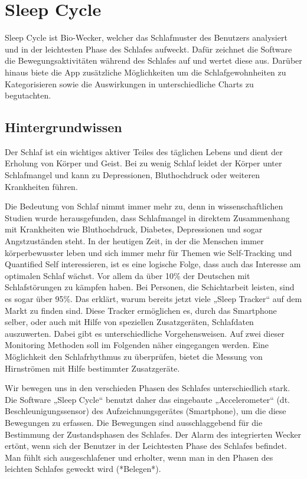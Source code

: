 \section{Sleep Cycle}
\label{ch:Apps:sec:SleepCycle}

Sleep Cycle ist Bio-Wecker, welcher das Schlafmuster des Benutzers analysiert und in der leichtesten Phase des Schlafes aufweckt.
Dafür zeichnet die Software die Bewegungsaktivitäten während des Schlafes auf und wertet diese aus.
Darüber hinaus biete die App zusätzliche Möglichkeiten um die Schlafgewohnheiten zu Kategorisieren sowie die Auswirkungen in unterschiedliche Charts zu begutachten. \cite{Chen:SleepMonitoring}

\subsection{Hintergrundwissen}
\label{ch:Apps:sec:Sleepcycle:subsec:H}

Der Schlaf ist ein wichtiges aktiver Teiles des täglichen Lebens und dient der Erholung von Körper und Geist.
Bei zu wenig Schlaf leidet der Körper unter Schlafmangel und kann zu Depressionen, Bluthochdruck oder weiteren Krankheiten führen. 

Die Bedeutung von Schlaf nimmt immer mehr zu, denn in wissenschaftlichen Studien wurde herausgefunden, dass Schlafmangel in direktem Zusammenhang mit Krankheiten wie Bluthochdruck, Diabetes, Depressionen und sogar Angstzuständen steht.
In der heutigen Zeit, in der die Menschen immer körperbewusster leben und sich immer mehr für Themen wie  Self-Tracking und Quantified Self  interessieren, ist es eine logische Folge, dass auch das Interesse am optimalen Schlaf  wächst.
Vor allem da über 10\% der Deutschen mit Schlafstörungen zu kämpfen haben. Bei Personen, die Schichtarbeit leisten, sind es sogar über 95\%.
Das erklärt, warum bereits jetzt viele „Sleep Tracker“  auf dem Markt zu finden sind.
Diese Tracker ermöglichen es, durch das Smartphone selber, oder auch mit Hilfe von speziellen Zusatzgeräten, Schlafdaten auszuwerten.
Dabei gibt es unterschiedliche Vorgehensweisen.
Auf zwei dieser Monitoring Methoden soll im Folgenden näher eingegangen werden.
Eine Möglichkeit den Schlafrhythmus zu überprüfen, bietet die Messung von Hirnströmen mit Hilfe bestimmter Zusatzgeräte.



Wir bewegen uns in den verschieden Phasen des Schlafes unterschiedlich stark. Die Software „Sleep Cycle“ benutzt daher das eingebaute „Accelerometer“ (dt. Beschleunigungssensor) des Aufzeichnungsgerätes (Smartphone), um die diese Bewegungen zu erfassen. Die Bewegungen sind ausschlaggebend für die Bestimmung der Zustandsphasen des Schlafes.
Der Alarm des integrierten Wecker ertönt, wenn sich der Benutzer in der Leichtesten Phase des Schlafes befindet.
Man fühlt sich ausgeschlafener und erholter, wenn man in den Phasen des leichten Schlafes geweckt wird (*Belegen*). 




